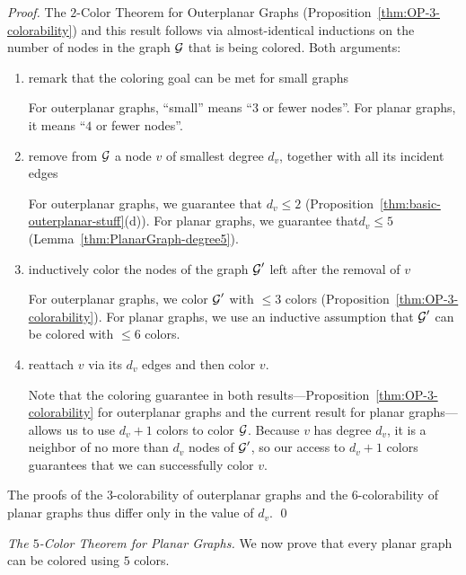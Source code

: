 \begin{proof}
The $2$-Color Theorem for Outerplanar Graphs
(Proposition~\ref{thm:OP-3-colorability}) and this result follows via
almost-identical inductions on the number of nodes in the graph $\mbox{$\cal G$}$
that is being colored.  Both arguments:
\begin{enumerate}
\item
remark that the coloring goal can be met for small graphs

For outerplanar graphs, ``small'' means ``$3$ or fewer nodes''.  For
planar graphs, it means ``$4$ or fewer nodes''.

\item
remove from $\mbox{$\cal G$}$ a node $v$ of smallest degree $d_v$, together with
all its incident edges

For outerplanar graphs, we guarantee that $d_v \leq 2$
(Proposition~\ref{thm:basic-outerplanar-stuff}(d)).  For planar
graphs, we guarantee that$d_v \leq 5$
(Lemma~\ref{thm:PlanarGraph-degree5}).

\item
inductively color the nodes of the graph $\mbox{$\cal G$}'$ left after the removal
of $v$

For outerplanar graphs, we color $\mbox{$\cal G$}'$ with $\leq 3$ colors
(Proposition~\ref{thm:OP-3-colorability}).  For planar
graphs, we use an inductive assumption that $\mbox{$\cal G$}'$ can be colored with
$\leq 6$ colors. 

\item
reattach $v$ via its $d_v$ edges and then color $v$.

Note that the coloring guarantee in both
results---Proposition~\ref{thm:OP-3-colorability} for outerplanar
graphs and the current result for planar graphs---allows us to use
$d_v +1$ colors to color $\mbox{$\cal G$}$.  Because $v$ has degree $d_v$, it is a
neighbor of no more than $d_v$ nodes of $\mbox{$\cal G$}'$, so our access to $d_v
+1$ colors guarantees that we can successfully color $v$.
\end{enumerate}
The proofs of the $3$-colorability of outerplanar graphs and the
$6$-colorability of planar graphs thus differ only in the value of
$d_v$.  \qed
\end{proof}

\bigskip

{\it The $5$-Color Theorem for Planar Graphs.}
We now prove that every planar graph can be colored using $5$ colors.
\bigskip

\noindent {}
\bigskip

